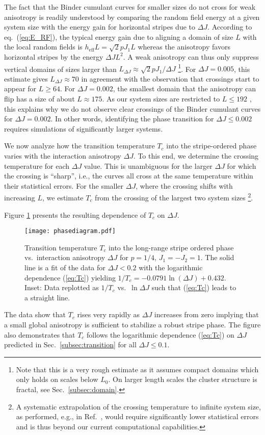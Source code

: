 \documentclass[twocolumn,showpacs,superscriptaddress,aps,prb]{revtex4-2}
\begin{document}
The fact that the Binder cumulant curves for smaller sizes do not cross for weak anisotropy
is readily understood by comparing the random field energy at a given system size with the energy
gain for horizontal stripes due to $\Delta J$. According to eq.\ (\ref{eq:E_RF}), the typical
energy gain due to aligning a domain of size $L$ with the local random fields is
$h_\mathrm{eff} L = \sqrt{2} p J_1 L$ whereas the anisotropy favors horizontal
stripes by the energy $\Delta J L^2$. A weak anisotropy can thus only suppress vertical domains
of sizes larger than $L_{\Delta J} \approx \sqrt{2} p J_1/ \Delta J$
\footnote{Note that this is a very rough estimate as it assumes
compact domains which only holds on scales below $L_0$. On larger length scales the cluster
structure is fractal, see Sec.\ \ref{subsec:domain}.}.
For $\Delta J =0.005$, this
estimate gives $L_{\Delta J} \approx 70$ in agreement with the observation that crossings start to appear
for $L \ge 64$. For $\Delta J = 0.002$, the smallest domain that the anisotropy can flip
has a size of about $L \approx 175$. As our system sizes are restricted to $L \le 192$ , this explains why
we do not observe clear crossings of the Binder cumulant curves for $\Delta J = 0.002$.
In other words, identifying the phase transition for $\Delta J \le 0.002$ requires simulations
of significantly larger systems.

We now analyze how the transition temperature $T_c$ into the stripe-ordered phase varies with the interaction
anisotropy $\Delta J$. To this end, we determine the crossing temperature for each $\Delta J$ value. This is
unambiguous for the larger $\Delta J$ for which the crossing is ``sharp'', i.e., the curves all cross
at the same temperature within their statistical errors. For the smaller $\Delta J$, where the crossing
shifts with increasing $L$, we estimate $T_c$ from the crossing of the largest two system sizes
\footnote{A systematic extrapolation of the crossing temperature to infinite system size, as performed,
e.g., in Ref.\ \cite{ZWNHV15}, would require significantly lower statistical errors and is thus beyond
our current computational capabilities.}.

Figure \ref{fig:Tc} presents the resulting dependence of $T_c$ on $\Delta J$.
\begin{figure}
\texttt{[image: phasediagram.pdf]}
\caption{Transition temperature $T_c$ into the long-range stripe ordered phase
vs.\ interaction anisotropy $\Delta J$ for $p=1/4$, $J_1=-J_2=1$. The solid line is a fit
of the data for $\Delta J < 0.2$ with the logarithmic dependence (\ref{eq:Tc})
yielding $1/T_c = -0.0791 \ln(\Delta J)+ 0.432$.
Inset: Data replotted as $1/T_c$ vs.\ $\ln \Delta J$ such that (\ref{eq:Tc}) leads to a straight line.}
\label{fig:Tc}
\end{figure}
The data show that $T_c$ rises very rapidly as $\Delta J$ increases from zero implying
that a small global anisotropy is sufficient to stabilize a robust stripe phase.
The figure also demonstrates that $T_c$ follows the logarithmic dependence (\ref{eq:Tc})
on $\Delta J$ predicted in Sec.\ \ref{subsec:transition} for all $\Delta J \le 0.1$.
\end{document}
